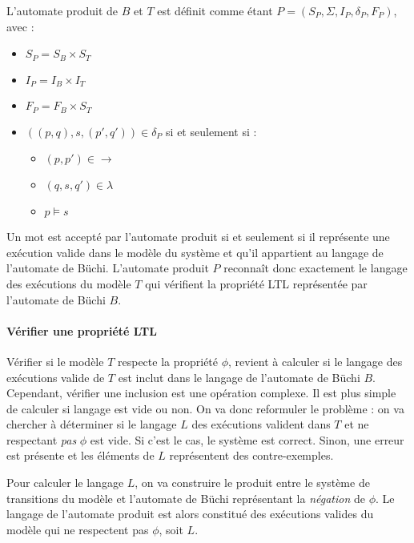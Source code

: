 L'automate produit de \(B\) et \(T\) est définit comme étant \(P = (S_P, \Sigma,
I_P, \delta_P, F_P)\), avec :

\begin{itemize}
\item
  \(S_P = S_B \times S_T\)
\item
  \(I_P = I_B \times I_T\)
\item
  \(F_P = F_B \times S_T\)
\item
  \(((p, q), s, (p', q')) \in \delta_P\) si et seulement si :

  \begin{itemize}
  \item
    \((p, p') \in \rightarrow\)
  \item
    \((q, s, q') \in \lambda\)
  \item
    \(p \models s\)
  \end{itemize}
\end{itemize}

Un mot est accepté par l'automate produit si et seulement si il représente
une exécution valide dans le modèle du système et qu'il appartient au langage
de l'automate de Büchi.
L'automate produit \(P\) reconnaît donc exactement le langage des exécutions du
modèle \(T\) qui vérifient la propriété LTL représentée par l'automate de
Büchi \(B\).

\paragraph{Vérifier une propriété LTL}

Vérifier si le modèle \(T\) respecte la propriété \(\phi\), revient à calculer
si le langage des exécutions valide de \(T\) est inclut dans le langage de
l'automate de Büchi \(B\). Cependant, vérifier une inclusion est une opération
complexe. Il est plus simple de calculer si langage est vide ou non. On va donc
reformuler le problème : on va chercher à déterminer si le langage \(L\) des
exécutions valident dans \(T\) et ne respectant \emph{pas} \(\phi\) est vide.
Si c'est le cas, le système est correct. Sinon, une erreur est présente et les
éléments de \(L\) représentent des contre-exemples.

Pour calculer le langage \(L\), on va construire le produit entre le système de
transitions du modèle et l'automate de Büchi représentant la \emph{négation} de
\(\phi\). Le langage de l'automate produit est alors constitué des exécutions valides du
modèle qui ne respectent pas \(\phi\), soit \(L\).

